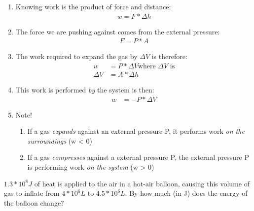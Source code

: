 \documentclass[../CHEM152Notes.tex]{subfiles}
\begin{document}
\begin{enumerate}
    \item Knowing work is the product of force and distance:
        \begin{equation*}
            \begin{aligned}
                w = F * \Delta h
            \end{aligned}
        \end{equation*}
    \item The force we are pushing against comes from the external pressure:
        \begin{equation*}
            \begin{aligned}
                F = P * A
            \end{aligned}
        \end{equation*}
    \item The work required to expand the gas by $\Delta V$ is therefore:
        \begin{equation*}
            \begin{aligned}
                w &= P * \Delta V \text{where $\Delta V$ is}\\
                \Delta V &= A * \Delta h
            \end{aligned}
        \end{equation*}
    \item This work is performed \emph{by} the system is then:
        \begin{equation*}
            \begin{aligned}
                w &= -P * \Delta V
            \end{aligned}
        \end{equation*}
    \item Note! 
        \begin{enumerate}
            \item If a gas \emph{expands} against an external pressure P, it performs work \emph{on the surroundings} (w < 0)
            \item If a gas \emph{compresses} against a external pressure P, the external pressure P is performing work \emph{on the system} (w > 0)
        \end{enumerate}
\end{enumerate}
\begin{exmp}
    $1.3*10^8 J$ of heat is applied to the air in a hot-air balloon, causing this volume of gas to inflate from $4*10^6L$ to $4.5*10^6L$. By how much (in J) does the energy of the balloon change?
\end{exmp}
\end{document}
